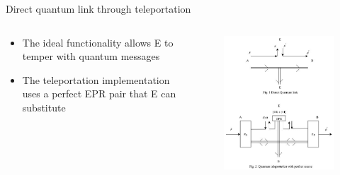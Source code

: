 \documentclass[final]{beamer}
\newlength{\twocolwid}
\begin{document}
\begin{frame}[t]
\begin{columns}[t]
\begin{column}{\twocolwid}
\begin{columns}[t,totalwidth=\twocolwid]
\begin{column}{\twocolwid}
\begin{block}{Direct quantum link through teleportation}
 
   \begin{columns}
     \begin{column}{.60\textwidth}
        \begin{itemize}
       \item The ideal functionality allows E to temper with quantum messages  
       \item The teleportation implementation uses a perfect EPR pair that E can substitute
   \end{itemize}
     \end{column}%
    \hfill%
    
     \begin{column}{.40\textwidth}
        \begin{figure}
         \includegraphics[width=0.95\linewidth]{direct_quantum_link.jpg}
       \end{figure}
     \end{column}%
   \end{columns}
  \vskip 1cm  
 
  \begin{columns}
   

\end{columns}
\end{block}
\end{column}
\end{columns}
\end{column}
\end{columns}
\end{frame}
\end{document}
